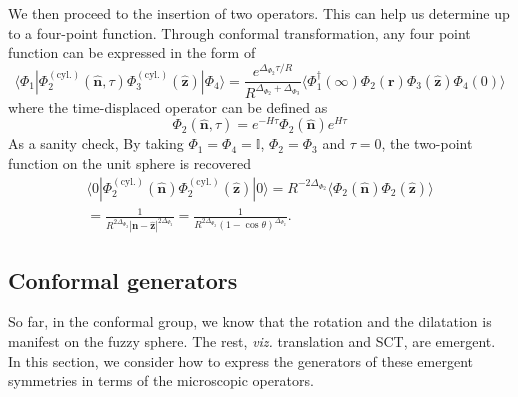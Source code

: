 \documentclass{timesjhep}
\begin{document}
We then proceed to the insertion of two operators. This can help us determine up to a four-point function. Through conformal transformation, any four point function can be expressed in the form of 
\begin{equation}
    \langle\Phi_1|\Phi^{\mathrm{(cyl.)}}_2(\hat{\mathbf{n}},\tau)\Phi^{\mathrm{(cyl.)}}_3(\hat{\mathbf{z}})|\Phi_4\rangle=\frac{e^{\Delta_{\Phi_2}\tau/R}}{R^{\Delta_{\Phi_2}+\Delta_{\Phi_3}}}\langle\Phi_1^\dagger(\infty)\Phi_2(\mathbf{r})\Phi_3(\hat{\mathbf{z}})\Phi_4(0)\rangle
\end{equation} where the time-displaced operator can be defined as
\begin{equation}
    \Phi_2(\hat{\mathbf{n}},\tau)=e^{-H\tau}\Phi_2(\hat{\mathbf{n}})e^{H\tau}
\end{equation} As a sanity check, By taking $\Phi_1=\Phi_4=\mathbb{I}$, $\Phi_2=\Phi_3$ and $\tau=0$, the two-point function on the unit sphere is recovered 
\begin{multline}
    \langle0|\Phi^{\mathrm{(cyl.)}}_2(\hat{\mathbf{n}})\Phi^{\mathrm{(cyl.)}}_2(\hat{\mathbf{z}})|0\rangle=R^{-2\Delta_{\Phi_2}}\langle\Phi_2(\hat{\mathbf{n}})\Phi_2(\hat{\mathbf{z}})\rangle\\=\frac{1}{R^{2\Delta_{\Phi_2}}|\hat{\mathbf{n}}-\hat{\mathbf{z}}|^{2\Delta_{\Phi_2}}}=\frac{1}{R^{2\Delta_{\Phi_2}}(1-\cos\theta)^{\Delta_{\Phi_2}}}.
\end{multline}

\subsection{Conformal generators}

So far, in the conformal group, we know that the rotation and the dilatation is manifest on the fuzzy sphere. The rest, \textit{viz.} translation and SCT, are emergent. In this section, we consider how to express the generators of these emergent symmetries in terms of the microscopic operators. 
\end{document}
